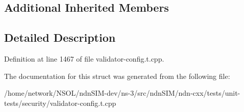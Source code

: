 \subsection*{Additional Inherited Members}


\subsection{Detailed Description}


Definition at line 1467 of file validator-\/config.\+t.\+cpp.



The documentation for this struct was generated from the following file\+:\begin{DoxyCompactItemize}
\item 
/home/network/\+N\+S\+O\+L/ndn\+S\+I\+M-\/dev/ns-\/3/src/ndn\+S\+I\+M/ndn-\/cxx/tests/unit-\/tests/security/validator-\/config.\+t.\+cpp\end{DoxyCompactItemize}
